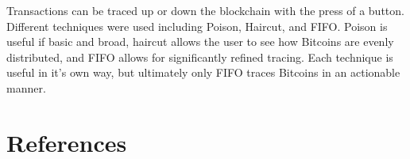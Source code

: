 \documentclass{article}
\begin{document}
Transactions can be traced up or down the blockchain with the press of a button. Different techniques were used including Poison, Haircut, and FIFO. Poison is useful if basic and broad, haircut allows the user to see how Bitcoins are evenly distributed, and FIFO allows for significantly refined tracing. Each technique is useful in it's own way, but ultimately only FIFO traces Bitcoins in an actionable manner.

\section*{References}

\nocite{*}
\printbibliography[heading=none]
\end{document}
